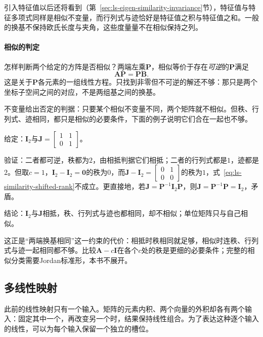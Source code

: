 引入特征值以后还将看到（第~\ref{sec:ls-eigen-similarity-invariance}节），特征值与特征多项式同样是相似不变量，而行列式与迹恰好是特征值之积与特征值之和。一般的换基不保持欧氏长度与夹角，这些度量量不在相似保持之列。

\paragraph{相似的判定}
\label{sec:ls-similarity-conditions}
怎样判断两个给定的方阵是否相似？两端左乘$\bm P$，相似等价于存在\emph{可逆}的$\bm P$满足
\begin{equation}
 \bm A\bm P=\bm P\bm B.
 \label{eq:ls-similarity-equation}
\end{equation}
这是关于$\bm P$各元素的一组线性方程。只找到非零但不可逆的解还不够：那只是两个坐标子空间之间的对应，不是两组基之间的换基。

不变量给出否定的判据：只要某个相似不变量不同，两个矩阵就不相似。但秩、行列式、迹相同，都只是相似的必要条件，下面的例子说明它们合在一起也不够。
\begin{example}[反例：相抵而不相似的两个矩阵]
\label{ex:ls-equivalent-not-similar}
给定：$\bm I_2$与$\bm J=\left[\begin{smallmatrix}1&1\\0&1\end{smallmatrix}\right]$。

验证：二者都可逆，秩都为$2$，由相抵判据它们相抵；二者的行列式都是$1$，迹都是$2$。但取$c=1$，$\bm I_2-\bm I_2=\bm0$的秩为$0$，而$\bm J-\bm I_2=\left[\begin{smallmatrix}0&1\\0&0\end{smallmatrix}\right]$的秩为$1$，式~\eqref{eq:ls-similarity-shifted-rank}不成立。更直接地，若$\bm J=\bm P^{-1}\bm I_2\bm P$，则$\bm J=\bm P^{-1}\bm P=\bm I_2$，矛盾。

结论：$\bm I_2$与$\bm J$相抵，秩、行列式与迹也都相同，却不相似；单位矩阵只与自己相似。
\end{example}
这正是“两端换基相同”这一约束的代价：相抵时秩相同就足够，相似时连秩、行列式与迹一起相同都不够。比较$\bm A-c\bm I$在各个$c$处的秩是更细的必要条件；完整的相似分类需要Jordan标准形，本书不展开。

\subsection{多线性映射}

此前的线性映射只有一个输入。矩阵的元素内积、两个向量的外积却各有两个输入：固定其中一个，再改变另一个时，结果保持线性组合。为了表达这种逐个输入的线性，可以为每个输入保留一个独立的槽位。

